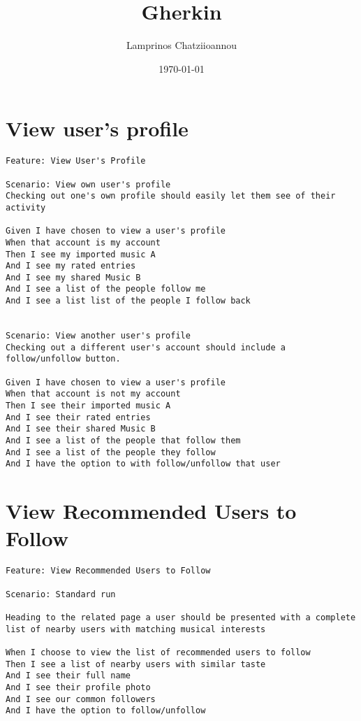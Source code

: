\documentclass[11pt]{article}
\author{Lamprinos Chatziioannou}
\date{\today}
\title{Gherkin}
\begin{document}
\maketitle
\tableofcontents

\section{View user's profile}
\label{sec:org6d848f3}
\begin{verbatim}
Feature: View User's Profile

Scenario: View own user's profile
Checking out one's own profile should easily let them see of their activity

Given I have chosen to view a user's profile
When that account is my account
Then I see my imported music A
And I see my rated entries
And I see my shared Music B
And I see a list of the people follow me
And I see a list list of the people I follow back


Scenario: View another user's profile
Checking out a different user's account should include a follow/unfollow button.

Given I have chosen to view a user's profile
When that account is not my account
Then I see their imported music A
And I see their rated entries
And I see their shared Music B
And I see a list of the people that follow them
And I see a list of the people they follow
And I have the option to with follow/unfollow that user
\end{verbatim}
\section{View Recommended Users to Follow}
\label{sec:org005e522}
\begin{verbatim}
Feature: View Recommended Users to Follow

Scenario: Standard run

Heading to the related page a user should be presented with a complete list of nearby users with matching musical interests

When I choose to view the list of recommended users to follow
Then I see a list of nearby users with similar taste
And I see their full name
And I see their profile photo 
And I see our common followers
And I have the option to follow/unfollow 
\end{verbatim}
\end{document}
